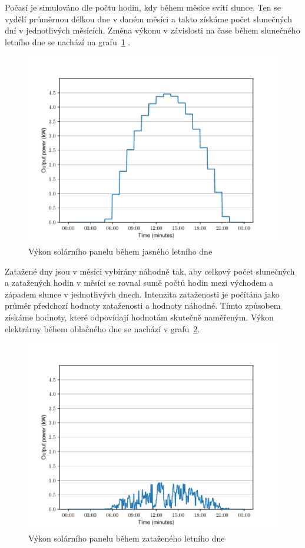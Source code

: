 \documentclass[12pt,a4paper]{article}
\begin{document}
Počasí je simulováno dle počtu hodin, kdy během měsíce svítí slunce. Ten se vydělí průměrnou délkou dne v daném měsíci a takto získáme počet slunečných dní v jednotlivých měsících.
Změna výkonu v závislosti na čase během slunečného letního dne se nachází na grafu~\ref{fig:solar_day_clear} \cite{Journal-of-PV-2020}.

\begin{figure}[H]
\begin{center}
\includegraphics[width=0.8\linewidth]{img/solar_day_clear.pdf}
\end{center}
\caption{Výkon solárního panelu během jasného letního dne}
\label{fig:solar_day_clear}
\end{figure}

Zatažené dny jsou v měsíci vybírány náhodně tak, aby celkový počet slunečných a zatažených hodin v měsíci se rovnal sumě počtů hodin mezi východem a západem slunce v jednotlivývh dnech. Intenzita zataženosti je počítána jako průměr předchozí hodnoty zataženosti a hodnoty náhodné. Tímto způsobem získáme hodnoty, které odpovídají hodnotám skutečně naměřeným. Výkon elektrárny během oblačného dne se nachází v grafu~\ref{fig:solar_day_cloudy}.

\begin{figure}[H]
\begin{center}
\includegraphics[width=0.8\linewidth]{img/solar_day_cloudy.pdf}
\end{center}
\caption{Výkon solárního panelu během zataženého letního dne}
\label{fig:solar_day_cloudy}
\end{figure}
\end{document}
